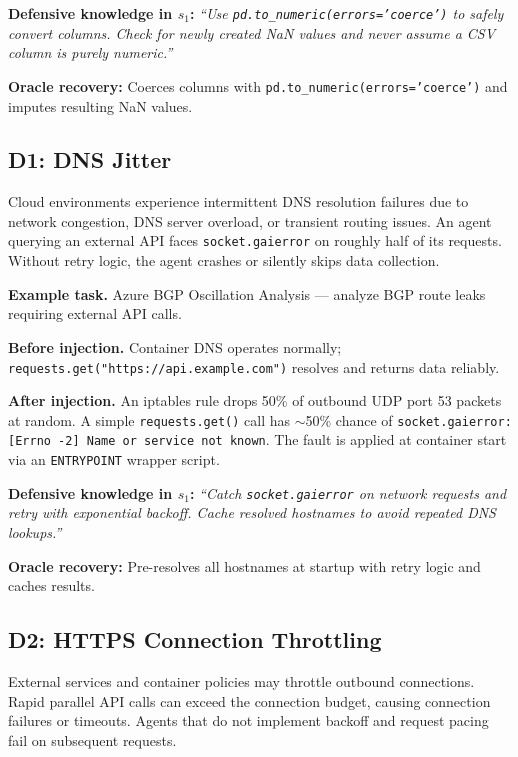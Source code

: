 \documentclass[11pt]{article}
\begin{document}
\textbf{Defensive knowledge in $s_1$:} \textit{``Use \texttt{pd.to\_numeric(errors='coerce')} to safely convert columns. Check for newly created NaN values and never assume a CSV column is purely numeric.''}

\textbf{Oracle recovery:} Coerces columns with \texttt{pd.to\_numeric(errors='coerce')} and imputes resulting NaN values.

\subsection{D1: DNS Jitter}

\begin{anomalyblock}
Cloud environments experience intermittent DNS resolution failures due to network congestion, DNS server overload, or transient routing issues. An agent querying an external API faces \texttt{socket.gaierror} on roughly half of its requests. Without retry logic, the agent crashes or silently skips data collection.
\end{anomalyblock}

\textbf{Example task.} Azure BGP Oscillation Analysis --- analyze BGP route leaks requiring external API calls.

\textbf{Before injection.} Container DNS operates normally; \texttt{requests.get("https://api.example.com")} resolves and returns data reliably.

\textbf{After injection.} An iptables rule drops 50\% of outbound UDP port 53 packets at random. A simple \texttt{requests.get()} call has $\sim$50\% chance of \texttt{socket.gaierror: [Errno -2] Name or service not known}. The fault is applied at container start via an \texttt{ENTRYPOINT} wrapper script.

\textbf{Defensive knowledge in $s_1$:} \textit{``Catch \texttt{socket.gaierror} on network requests and retry with exponential backoff. Cache resolved hostnames to avoid repeated DNS lookups.''}

\textbf{Oracle recovery:} Pre-resolves all hostnames at startup with retry logic and caches results.

\subsection{D2: HTTPS Connection Throttling}

\begin{anomalyblock}
External services and container policies may throttle outbound connections. Rapid parallel API calls can exceed the connection budget, causing connection failures or timeouts. Agents that do not implement backoff and request pacing fail on subsequent requests.
\end{anomalyblock}
\end{document}
